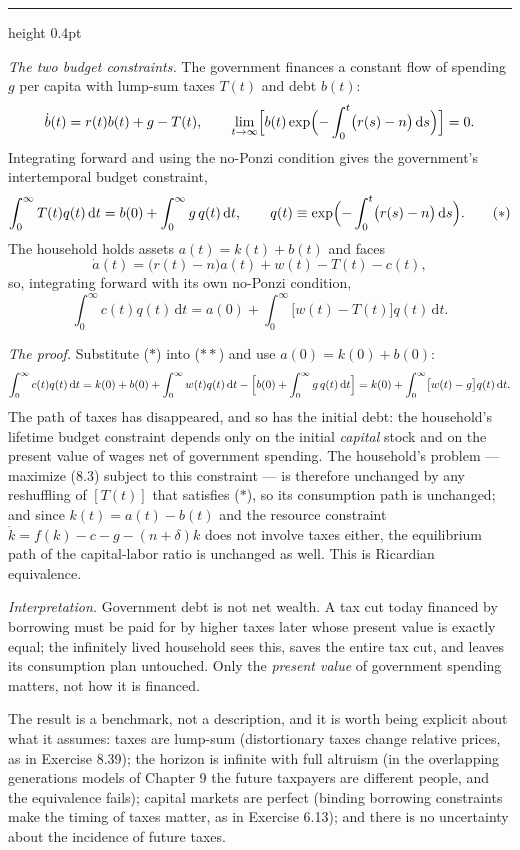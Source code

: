 \documentclass[11pt,letterpaper,reqno]{amsart}
\makeatletter
\newcommand{\dd}{\,\mathrm{d}}
\newcommand{\dt}[1]{\dot{#1}}
\newcommand{\as@head}[3]{%
  \par\addvspace{1.6ex}\penalty-200\relax
  \phantomsection
  \addcontentsline{toc}{subsection}{#1 #2\texorpdfstring{\ifx\relax#3\relax\else\quad #3\fi}{}}%
  {\color{RuleGrey}\hrule height 0.4pt}%
  \nobreak\vspace{0.8ex}\nobreak
  \noindent{\bfseries #1 #2}%
  \ifx\relax#3\relax\else\quad{\bfseries\itshape #3}\fi
  \par\nobreak\vspace{0.4ex}\nobreak
  \as@beginstatement
}
\newcommand{\as@beginstatement}{\begingroup\itshape\ignorespaces}
\newenvironment{aex}[2]{\as@head{Exercise}{#1}{#2}}{\par\addvspace{1.2ex}}
\newcommand{\bk}[1]{\textup{\textsc{#1}}}
\renewcommand{\as@beginstatement}{\ignorespaces}
\makeatother
\begin{document}
\begin{aex}{8.35}{}
\emph{The two budget constraints.}  The government finances a constant flow of spending $g$ per capita with
lump-sum taxes $T(t)$ and debt $b(t)$:
\[
\dt b(t)=r(t)b(t)+g-T(t),
\qquad
\lim_{t\to\infty}\Bigl[b(t)\exp\Bigl(-\int_0^{t}\bigl(r(s)-n\bigr)\dd s\Bigr)\Bigr]=0 .
\]
Integrating forward and using the no-Ponzi condition gives the government's intertemporal budget
constraint,
\[
\int_0^{\infty}T(t)q(t)\dd t=b(0)+\int_0^{\infty}g\,q(t)\dd t ,
\qquad
q(t)\equiv\exp\Bigl(-\int_0^{t}\bigl(r(s)-n\bigr)\dd s\Bigr).
\tag{$*$}
\]
The household holds assets $a(t)=k(t)+b(t)$ and faces
\[
\dt a(t)=\bigl(r(t)-n\bigr)a(t)+w(t)-T(t)-c(t) ,
\]
so, integrating forward with its own no-Ponzi condition,
\[
\int_0^{\infty}c(t)q(t)\dd t=a(0)+\int_0^{\infty}\bigl[w(t)-T(t)\bigr]q(t)\dd t .
\tag{$**$}
\]

\emph{The proof.}  Substitute ($*$) into ($**$) and use $a(0)=k(0)+b(0)$:
\[
\int_0^{\infty}c(t)q(t)\dd t
=k(0)+b(0)+\int_0^{\infty}w(t)q(t)\dd t-\Bigl[b(0)+\int_0^{\infty}g\,q(t)\dd t\Bigr]
=k(0)+\int_0^{\infty}\bigl[w(t)-g\bigr]q(t)\dd t .
\]
The path of taxes has disappeared, and so has the initial debt: the household's lifetime budget constraint
depends only on the initial \emph{capital} stock and on the present value of wages net of government
spending.  The household's problem --- maximize \bk{(8.3)} subject to this constraint --- is therefore
unchanged by any reshuffling of $[T(t)]$ that satisfies ($*$), so its consumption path is unchanged; and
since $k(t)=a(t)-b(t)$ and the resource constraint $\dt k=f(k)-c-g-(n+\delta)k$ does not involve taxes
either, the equilibrium path of the capital-labor ratio is unchanged as well.  This is Ricardian
equivalence.

\emph{Interpretation.}  Government debt is not net wealth.  A tax cut today financed by borrowing must be
paid for by higher taxes later whose present value is exactly equal; the infinitely lived household sees
this, saves the entire tax cut, and leaves its consumption plan untouched.  Only the \emph{present value}
of government spending matters, not how it is financed.

The result is a benchmark, not a description, and it is worth being explicit about what it assumes: taxes
are lump-sum (distortionary taxes change relative prices, as in Exercise 8.39); the horizon is infinite
with full altruism (in the overlapping generations models of Chapter 9 the future taxpayers are different
people, and the equivalence fails); capital markets are perfect (binding borrowing constraints make the
timing of taxes matter, as in Exercise 6.13); and there is no uncertainty about the incidence of future
taxes.
\end{aex}
\end{document}
